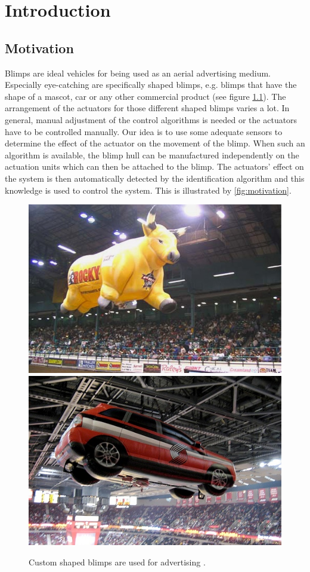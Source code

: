 \chapter{Introduction}
\label{chap:introduction}

\section{Motivation}
Blimps are ideal vehicles for being used as an aerial advertising medium.
Especially eye-catching are specifically shaped blimps, e.g. blimps that have the shape of a mascot, car or any other commercial product (see figure \ref{fig:blimps}).
The arrangement of the actuators for those different shaped blimps varies a lot.
In general, manual adjustment of the control algorithms is needed or the actuators have to be controlled manually.
Our idea is to use some adequate sensors to determine the effect of the actuator on the movement of the blimp.
When such an algorithm is available, the blimp hull can be manufactured independently on the actuation units which can then be attached to the blimp.
The actuators' effect on the system is then automatically detected by the identification algorithm and this knowledge is used to control the system.
This is illustrated by \cref{fig:motivation}.

\begin{figure}[hbtp]
\captionsetup{width=0.9\textwidth}
\centering
\includegraphics[width=.45\linewidth]{images/intro/CustomBull_Lg.jpg}
\includegraphics[width=.45\linewidth]{images/intro/CustomCar.jpg}
\caption{Custom shaped blimps are used for advertising \citep{rcblimps}.}
\label{fig:blimps}
\end{figure}

